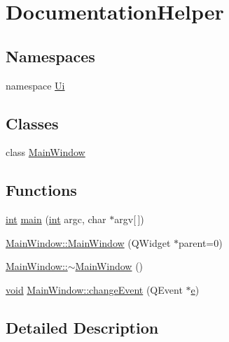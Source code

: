 \hypertarget{group___documentation_helper}{\section{Documentation\-Helper}
\label{group___documentation_helper}
}
\subsection*{Namespaces}
\begin{DoxyCompactItemize}
\item 
namespace \hyperlink{namespace_ui}{Ui}
\end{DoxyCompactItemize}
\subsection*{Classes}
\begin{DoxyCompactItemize}
\item 
class \hyperlink{class_main_window}{Main\-Window}
\end{DoxyCompactItemize}
\subsection*{Functions}
\begin{DoxyCompactItemize}
\item 
\hyperlink{ioapi_8h_a787fa3cf048117ba7123753c1e74fcd6}{int} \hyperlink{group___documentation_helper_ga0ddf1224851353fc92bfbff6f499fa97}{main} (\hyperlink{ioapi_8h_a787fa3cf048117ba7123753c1e74fcd6}{int} argc, char $\ast$argv\mbox{[}$\,$\mbox{]})
\item 
\hyperlink{group___documentation_helper_ga8b244be8b7b7db1b08de2a2acb9409db}{Main\-Window\-::\-Main\-Window} (Q\-Widget $\ast$parent=0)
\item 
\hyperlink{group___documentation_helper_gae98d00a93bc118200eeef9f9bba1dba7}{Main\-Window\-::$\sim$\-Main\-Window} ()
\item 
\hyperlink{group___u_a_v_objects_plugin_ga444cf2ff3f0ecbe028adce838d373f5c}{void} \hyperlink{group___documentation_helper_gaf4ca5d0d3d18ddcb7d54b6596bbf4797}{Main\-Window\-::change\-Event} (Q\-Event $\ast$\hyperlink{_o_p_plots_8m_a9425be9aab51621e317ba7ade564b570}{e})
\end{DoxyCompactItemize}


\subsection{Detailed Description}


